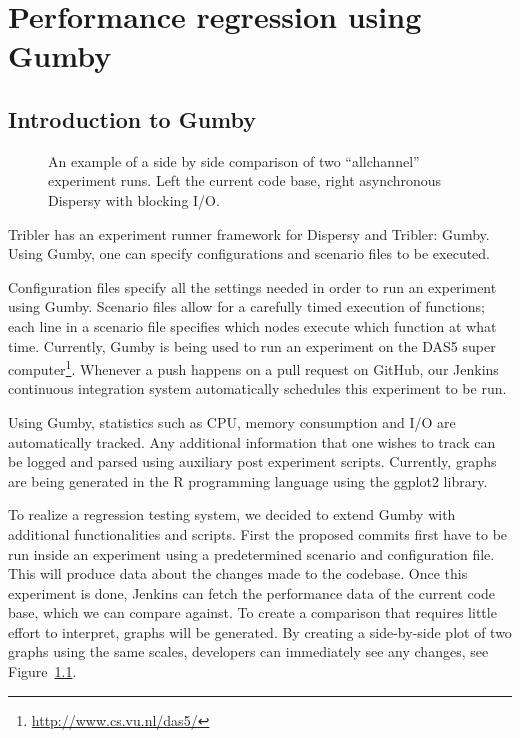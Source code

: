 \chapter{Performance regression using Gumby}

\section{Introduction to Gumby}
\begin{figure}[h]
	\caption{An example of a side by side comparison of two \enquote{allchannel} experiment runs. Left the current code base, right asynchronous Dispersy with blocking I/O.}
	\label{fig:side_by_side_send}
\end{figure} 

Tribler has an experiment runner framework for Dispersy and Tribler: Gumby.
Using Gumby, one can specify configurations and scenario files to be executed.

Configuration files specify all the settings needed in order to run an experiment using Gumby.
Scenario files allow for a carefully timed execution of functions; each line in a scenario file specifies which nodes execute which function at what time. 
Currently, Gumby is being used to run an experiment on the DAS5 super computer\footnote{\url{http://www.cs.vu.nl/das5/}}.
Whenever a push happens on a pull request on GitHub, our Jenkins continuous integration system automatically schedules this experiment to be run.

Using Gumby, statistics such as CPU, memory consumption and I/O are automatically tracked.
Any additional information that one wishes to track can be logged and parsed using auxiliary post experiment scripts.
Currently, graphs are being generated in the R programming language using the ggplot2 library.

To realize a regression testing system, we decided to extend Gumby with additional functionalities and scripts.
First the proposed commits first have to be run inside an experiment using a predetermined scenario and configuration file.
This will produce data about the changes made to the codebase.
Once this experiment is done, Jenkins can fetch the performance data of the current code base, which we can compare against.
To create a comparison that requires little effort to interpret, graphs  will be generated.
By creating a side-by-side plot of two graphs using the same scales, developers can immediately see any changes, see Figure~\ref{fig:side_by_side_send}.

